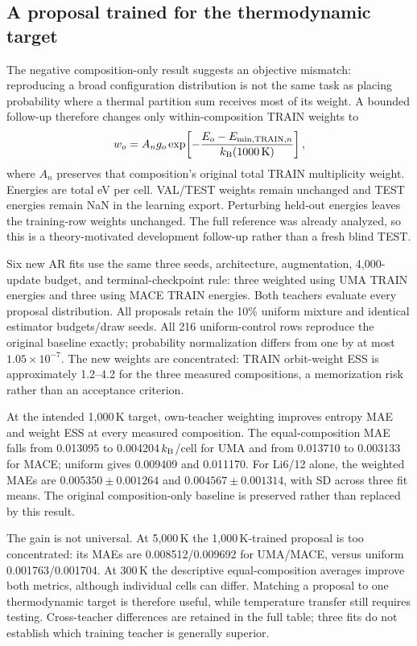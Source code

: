 \subsection{A proposal trained for the thermodynamic target}
The negative composition-only result suggests an objective mismatch:
reproducing a broad configuration distribution is not the same task as
placing probability where a thermal partition sum receives most of its
weight. A bounded follow-up therefore changes only within-composition TRAIN
weights to
\begin{equation}
w_o=A_n g_o\exp\!\left[-\frac{E_o-E_{\min,\mathrm{TRAIN},n}}
                              {k_{\rm B}(1000\,\mathrm K)}\right],
\end{equation}
where $A_n$ preserves that composition's original total TRAIN multiplicity
weight. Energies are total eV per cell. VAL/TEST weights remain unchanged
and TEST energies remain NaN in the learning export. Perturbing held-out
energies leaves the training-row weights unchanged. The full reference was already
analyzed, so this is a theory-motivated development follow-up rather than a
fresh blind TEST.

Six new AR fits use the same three seeds, architecture, augmentation,
4,000-update budget, and terminal-checkpoint rule: three weighted using UMA
TRAIN energies and three using MACE TRAIN energies. Both teachers evaluate
every proposal distribution. All proposals retain the 10\% uniform mixture
and identical estimator budgets/draw seeds. All 216 uniform-control rows
reproduce the original baseline exactly; probability normalization differs
from one by at most $1.05\times10^{-7}$. The new weights are concentrated:
TRAIN orbit-weight ESS is approximately 1.2--4.2 for the three measured
compositions, a memorization risk rather than an acceptance criterion.



At the intended 1,000\,K target, own-teacher weighting improves entropy MAE
and weight ESS at every measured composition. The equal-composition MAE
falls from 0.013095 to 0.004204\,$k_{\rm B}$/cell for UMA and from 0.013710 to
0.003133 for MACE; uniform gives 0.009409 and 0.011170. For Li6/12 alone,
the weighted MAEs are $0.005350\pm0.001264$ and
$0.004567\pm0.001314$, with SD across three fit means. The original
composition-only baseline is preserved rather than replaced by this result.

The gain is not universal. At 5,000\,K the 1,000\,K-trained proposal is too
concentrated: its MAEs are 0.008512/0.009692 for UMA/MACE, versus uniform
0.001763/0.001704. At 300\,K the descriptive equal-composition averages
improve both metrics, although individual cells can differ. Matching a
proposal to one thermodynamic target is therefore useful, while temperature
transfer still requires testing. Cross-teacher differences are retained in
the full table; three fits do not establish which training teacher is
generally superior.

